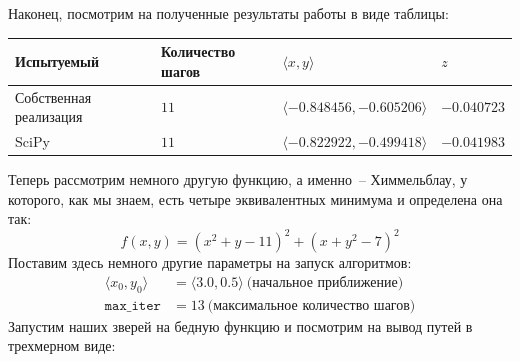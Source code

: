 \documentclass[12pt, a4paper, oneside, final]{article}
\begin{document}
	Наконец, посмотрим на полученные результаты работы в виде таблицы:
	\begin{table}[H]
		\centering
		\begin{tabular}{l|l|l|l}
			Испытуемый & Количество шагов & $\langle x, y \rangle$ & $z$ \\ \hline
			Собственная реализация & $11$ & $\langle -0.848456, -0.605206 \rangle$ & $-0.040723$ \\
			SciPy & $11$ & $\langle -0.822922, -0.499418 \rangle$ & $-0.041983$
		\end{tabular}
	\end{table}
	Теперь рассмотрим немного другую функцию, а именно~-- Химмельблау, у которого, как мы знаем, есть четыре эквивалентных минимума и определена она так:
	\[
		f(x, y) = \left(x^2 + y - 11\right)^2 + (x + y^2 - 7)^2
	\]
	Поставим здесь немного другие параметры на запуск алгоритмов:
	\begin{align*}
		\langle x_0, y_0 \rangle &= \langle 3.0, 0.5 \rangle~\text{(начальное приближение)} \\
		\mathtt{max\_iter} &= 13~\text{(максимальное количество шагов)}
	\end{align*}
	Запустим наших зверей на бедную функцию и посмотрим на вывод путей в трехмерном виде:
\end{document}
